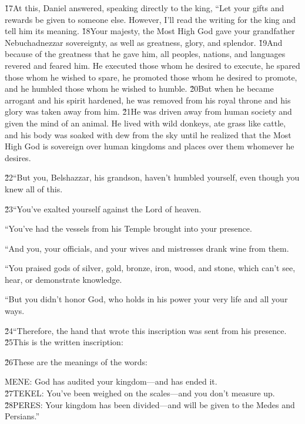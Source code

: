 \v{17}At this, Daniel answered, speaking directly to the king, ``Let your gifts and rewards be given to someone else. However, I'll read the writing for the king and tell him its meaning. \v{18}Your majesty, the Most High God gave your grandfather Nebuchadnezzar sovereignty, as well as greatness, glory, and splendor. \v{19}And because of the greatness that he gave him, all peoples, nations, and languages revered and feared him. He executed those whom he desired to execute, he spared those whom he wished to spare, he promoted those whom he desired to promote, and he humbled those whom he wished to humble. \v{20}But when he became arrogant and his spirit hardened, he was removed from his royal throne and his glory was taken away from him. \v{21}He was driven away from human society and given the mind of an animal. He lived with wild donkeys, ate grass like cattle, and his body was soaked with dew from the sky until he realized that the Most High God is sovereign over human kingdoms and places over them whomever he desires.

\v{22}``But you, Belshazzar, his grandson, haven't humbled yourself, even though you knew all of this.

\v{23}``You've exalted yourself against the Lord of heaven.

``You've had the vessels from his Temple brought into your presence.

``And you, your officials, and your wives and mistresses drank wine from them.

``You praised gods of silver, gold, bronze, iron, wood, and stone, which can't see, hear, or demonstrate knowledge.

``But you didn't honor God, who holds in his power your very life and all your ways.

\v{24}``Therefore, the hand that wrote this inscription was sent from his presence. \v{25}This is the written inscription:


\v{26}These are the meanings of the words:

\begin{poetry}
\poeml MENE: God has audited your kingdom---and has ended it. \\
\poeml \v{27}TEKEL: You've been weighed on the scales---and you don't measure up. \\
\poeml \v{28}PERES: Your kingdom has been divided---and will be given to the Medes and Persians.''
\end{poetry}


